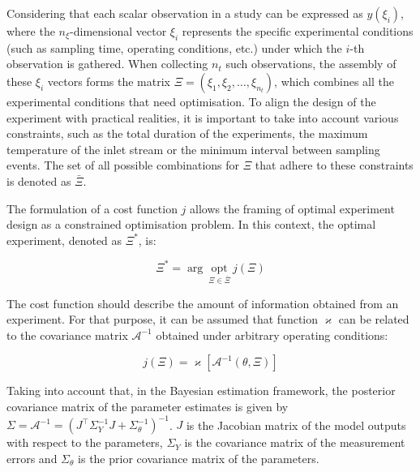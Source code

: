 \documentclass[a4paper,fleqn]{cas-dc}
\begin{document}
		Considering that each scalar observation in a study can be expressed as $y(\xi_i)$, where the $n_\xi$-dimensional vector $\xi_i$ represents the specific experimental conditions (such as sampling time, operating conditions, etc.) under which the $i$-th observation is gathered. When collecting $n_t$ such observations, the assembly of these $\xi_i$ vectors forms the matrix $\Xi = (\xi_1, \xi_2, \dots, \xi_{n_t})$, which combines all the experimental conditions that need optimisation. To align the design of the experiment with practical realities, it is important to take into account various constraints, such as the total duration of the experiments, the maximum temperature of the inlet stream or the minimum interval between sampling events. The set of all possible combinations for $\Xi$ that adhere to these constraints is denoted as $\bar{\Xi}$.
		
		The formulation of a cost function $j$ allows the framing of optimal experiment design as a constrained optimisation problem. In this context, the optimal experiment, denoted as $\Xi^*$, is:
		
		{\footnotesize \begin{equation} \Xi^* = \arg~\underset{\Xi \in \bar{\Xi}}{\text{opt}}~j\left(\Xi\right) \end{equation} }
		
		The cost function should describe the amount of information obtained from an experiment. For that purpose, it can be assumed that function $\varkappa$ can be related to the covariance matrix $\mathcal{A}^{-1}$ obtained under arbitrary operating conditions:
		
		{\footnotesize \begin{equation} j(\Xi) = \varkappa\left[ \mathcal{A}^{-1}(\theta, \Xi) \right] \end{equation} }
		
		Taking into account that, in the Bayesian estimation framework, the posterior covariance matrix of the parameter estimates is given by $\Sigma = \mathcal{A}^{-1} = \left(J^\top \Sigma_Y^{-1} J + \Sigma_\theta^{-1}\right)^{-1} $. $J$ is the Jacobian matrix of the model outputs with respect to the parameters, $\Sigma_Y$ is the covariance matrix of the measurement errors and $\Sigma_\theta$ is the prior covariance matrix of the parameters.
		
\end{document}

